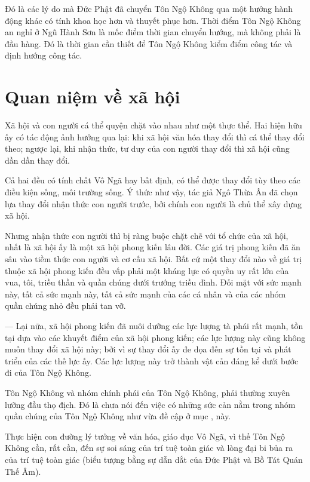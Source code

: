 Đó là các lý do mà Đức Phật đã chuyển Tôn Ngộ Không qua một hướng hành động khác có tính khoa học hơn và thuyết phục hơn. Thời điểm Tôn Ngộ Không an nghỉ ở Ngũ Hành Sơn là mốc điểm thời gian chuyển hướng, mà không phải là đầu hàng. Đó là thời gian cần thiết để Tôn Ngộ Không kiểm điểm công tác và định hướng công tác.


\section{Quan niệm về xã hội} %
\label{sec:8_xa_hoi}

Xã hội và con người cá thể quyện chặt vào nhau như một thực thể. Hai hiện hữu ấy có tác động ảnh hưởng qua lại: khi xã hội văn hóa thay đổi thì cá thể thay đổi theo; ngược lại, khi nhận thức, tư duy của con người thay đổi thì xã hội cũng dần dần thay đổi.

Cả hai đều có tính chất Vô Ngã hay bất định, có thể được thay đổi tùy theo các điều kiện sống, môi trường sống. Ý thức như vậy, tác giả Ngô Thừa Ân đã chọn lựa thay đổi nhận thức con người trước, bởi chính con người là chủ thể xây dựng xã hội.

Nhưng nhận thức con người thì bị ràng buộc chặt chẽ với tổ chức của xã hội, nhất là xã hội ấy là một xã hội phong kiến lâu đời. Các giá trị phong kiến đã ăn sâu vào tiềm thức con người và cơ cấu xã hội. Bất cứ một thay đổi nào về giá trị thuộc xã hội phong kiến đều vấp phải một kháng lực có quyền uy rất lớn của vua, tôi, triều thần và quần chúng dưới trướng triều đình. Đối mặt với sức mạnh này, tất cả sức mạnh này, tất cả sức mạnh của các cá nhân và của các nhóm quần chúng nhỏ đều phải tan vỡ.

--- Lại nữa, xã hội phong kiến đã nuôi dưỡng các lực lượng tà phái rất mạnh, tồn tại dựa vào các khuyết điểm của xã hội phong kiến; các lực lượng này cũng không muốn thay đổi xã hội này; bởi vì sự thay đổi ấy đe dọa đến sự tồn tại và phát triển của các thế lực ấy. Các lực lượng này trở thành vật cản đáng kể dưới bước đi của Tôn Ngộ Không.

Tôn Ngộ Không và nhóm chính phái của Tôn Ngộ Không, phải thường xuyên lưỡng đầu thọ địch. Đó là chưa nói đến việc có những sức cản nằm trong nhóm quần chúng của Tôn Ngộ Không như vừa đề cập ở mục ,  này.

Thực hiện con đường lý tưởng về văn hóa, giáo dục Vô Ngã, vì thế Tôn Ngộ Không cần, rất cần, đến sự soi sáng của trí tuệ toàn giác và lòng đại bi bủa ra của trí tuệ toàn giác (biểu tượng bằng sự dẫn dắt của Đức Phật và Bồ Tát Quán Thế Âm).

